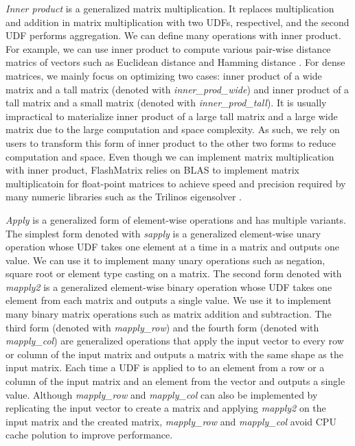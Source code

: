 \textit{Inner product} is a generalized matrix multiplication. It replaces
multiplication and addition in matrix multiplication with two UDFs,
respectivel, and the second UDF performs aggregation.
We can define many operations with inner
product. For example, we can use inner product to compute various pair-wise
distance matrics of vectors such as Euclidean distance \cite{euclidean} and
Hamming distance \cite{hamming}. For dense matrices, we mainly focus on
optimizing two cases: inner product of a wide matrix and a tall matrix (denoted
with \textit{inner\_prod\_wide}) and inner product of a tall matrix and a small
matrix (denoted with \textit{inner\_prod\_tall}). It is usually impractical to
materialize inner product of a large tall matrix and a large wide matrix due to
the large computation and space complexity. As such, we rely on users to
transform this form of inner product to the other two forms to reduce computation
and space. Even though we can implement matrix multiplication with inner product,
FlashMatrix relies on BLAS to implement matrix multiplicatoin for
float-point matrices to achieve speed and precision required by
many numeric libraries such as the Trilinos eigensolver \cite{anasazi, FlashEigen}.

\textit{Apply} is a generalized form of element-wise operations and has
multiple variants. The simplest form denoted with \textit{sapply} is
a generalized element-wise unary operation whose UDF takes one element at a time
in a matrix and outputs one value. We can use it to implement many unary
operations such as negation, square root or element type casting
on a matrix. The second form denoted with \textit{mapply2} is a generalized
element-wise binary operation whose UDF takes one element from each
matrix and outputs a single value. We use it to implement many binary
matrix operations such as matrix addition and subtraction. The third form
(denoted with \textit{mapply\_row}) and the fourth form (denoted with
\textit{mapply\_col}) are generalized
operations that apply the input vector to every row or column of the input
matrix and outputs a matrix with the same shape as the input matrix. Each time
a UDF is applied to to an element from a row or a column of the input matrix
and an element from the vector and outputs a single value. Although
\textit{mapply\_row} and \textit{mapply\_col} can also be implemented by
replicating the input vector to create a matrix and applying \textit{mapply2}
on the input matrix and the created matrix, \textit{mapply\_row} and
\textit{mapply\_col} avoid CPU cache polution to improve performance.

